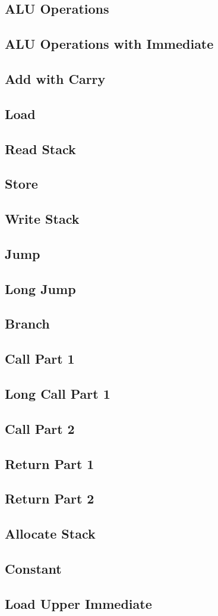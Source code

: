 \documentclass{report}
\begin{document}
		\subsection{ALU Operations}
		\subsection{ALU Operations with Immediate}
		\subsection{Add with Carry}
		\subsection{Load}
		\subsection{Read Stack}
		\subsection{Store}
		\subsection{Write Stack}
		\subsection{Jump}
		\subsection{Long Jump}
		\subsection{Branch}
		\subsection{Call Part 1}
		\subsection{Long Call Part 1}
		\subsection{Call Part 2}
		\subsection{Return Part 1}
		\subsection{Return Part 2}
		\subsection{Allocate Stack}
		\subsection{Constant}
		\subsection{Load Upper Immediate}
\end{document}
